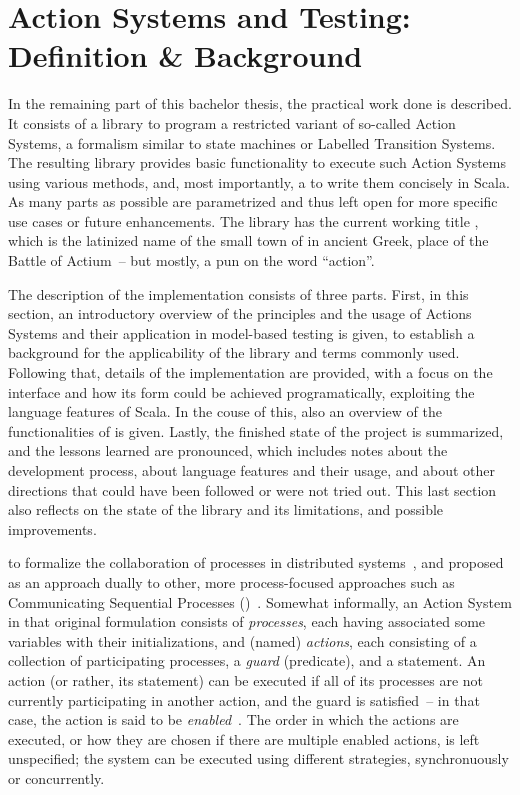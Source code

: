\chapter{Action Systems and Testing: Definition \& Background}
\label{sec:action_systems}

\lstset{deletestring=[b]'}

In the remaining part of this bachelor thesis, the practical work done is described. It consists of
a library to program a restricted variant of so-called Action Systems, a formalism similar to state
machines or Labelled Transition Systems. The resulting library provides basic functionality to
execute such Action Systems using various methods, and, most importantly, a \dsl{} to write them
concisely in Scala. As many parts as possible are parametrized and thus left open for more specific
use cases or future enhancements. The library has the current working title \actium, which is the
latinized name of the small town of \kern1pt\kern-4pt in ancient Greek, place of the
Battle of Actium~-- but mostly, a pun on the word \enquote{action}.

The description of the implementation consists of three parts. First, in this section, an
introductory overview of the principles and the usage of Actions Systems and their application in
model-based testing is given, to establish a background for the applicability of the library and
terms commonly used. Following that, details of the implementation are provided, with a focus on the
\dsl{} interface and how its form could be achieved programatically, exploiting the language
features of Scala. In the couse of this, also an overview of the functionalities of \actium{} is
given. Lastly, the finished state of the project is summarized, and the lessons learned are
pronounced, which includes notes about the development process, about language features and their
usage, and about other directions that could have been followed or were not tried out. This last
section also reflects on the state of the library and its limitations, and possible improvements.

 to formalize the collaboration of processes in
distributed systems~\cite{back1983:decentralization}, and proposed as an approach dually to other,
more process-focused approaches such as Communicating Sequential Processes
()~\cite{hoare1978:communicating}. Somewhat informally, an Action System in that
original formulation consists of \emph{processes}, each having associated some variables with their
initializations, and (named) \emph{actions}, each consisting of a collection of participating
processes, a \emph{guard} (predicate), and a statement. An action (or rather, its statement) can be
executed if all of its processes are not currently participating in another action, and the guard is
satisfied~-- in that case, the action is said to be \emph{enabled}~\cite{back1988:distributed}. The
order in which the actions are executed, or how they are chosen if there are multiple enabled
actions, is left unspecified; the system can be executed using different strategies, synchronuously
or concurrently.

